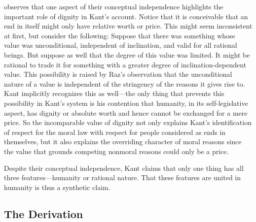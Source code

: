 \documentclass[12pt]{article}
\begin{document}
\citet{Wood:1999zy} observes that one aspect of their conceptual independence highlights the important role of dignity in Kant's account. Notice that it is conceivable that an end in itself might only have relative worth or price. This might seem inconsistent at first, but consider the following: Suppose that there was something whose value was unconditional, independent of inclination, and valid for all rational beings. But suppose as well that the degree of this value was limited. It might be rational to trade it for something with a greater degree of inclination-dependent value. This possibility is raised by Raz's \citeyearpar{Raz:2001ps} observation that the unconditional nature of a value is independent of the stringency of the reasons it gives rise to. Kant implicitly recognizes this as well---the only thing that prevents this possibility in Kant's system is his contention that humanity, in its self-legislative aspect, has dignity or absolute worth and hence cannot be exchanged for a mere price. So the incomparable value of dignity not only explains Kant's identification of respect for the moral law with respect for people considered as ends in themselves, but it also explains the overriding character of moral reasons since the value that grounds competing nonmoral reasons could only be a price.

Despite their conceptual independence, Kant claims that only one thing has all three features---humanity or rational nature. That these features are united in humanity is thus a synthetic claim.


\subsection{The Derivation} \label{sub:the_derivation} %
\end{document}
